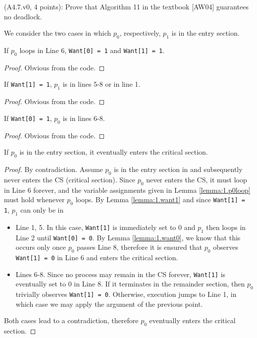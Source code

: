 \begin{Exc}{(A4.7.v0, 4 points):}
Prove that Algorithm 11 in the textbook [AW04] guarantees no deadlock.
\end{Exc}

We consider the two cases in which $p_0$, respectively, $p_1$
is in the entry section.

\begin{lemma} \label{lemma:1.p0loop}
If $p_0$ loops in Line 6, \lstinline|Want[0] = 1| and \lstinline|Want[1] = 1|.
\end{lemma}

\begin{proof}
Obvious from the code.
\end{proof}

\begin{lemma} \label{lemma:1.want1}
If \lstinline|Want[1] = 1|, $p_1$ is in lines 5-8 or in line 1.
\end{lemma}

\begin{proof}
Obvious from the code.
\end{proof}

\begin{lemma} \label{lemma:1.want0}
If \lstinline|Want[0] = 1|, $p_0$ is in lines 6-8.
\end{lemma}

\begin{proof}
Obvious from the code.
\end{proof}

\begin{lemma} \label{lemma:1.p0}
If $p_0$ is in the entry section, it eventually enters the critical section.
\end{lemma}

\begin{proof}
By contradiction. Assume $p_0$ is in the entry section in and subsequently
never enters the CS (critical section).
Since $p_0$ never enters the CS, it must loop in Line 6 forever, and
the variable assignments given in Lemma \ref{lemma:1.p0loop} must hold
whenever $p_0$ loops. By Lemma \ref{lemma:1.want1} and since 
\lstinline|Want[1] = 1|, $p_1$ can only be in

\begin{itemize}
\item Line 1, 5. In this case, \lstinline|Want[1]| is immediately set to 0 and $p_1$
      then loops in Line 2 until \lstinline|Want[0] = 0|. By Lemma \ref{lemma:1.want0},
      we know that this occurs only once $p_0$ passes Line 8, therefore
      it is ensured that $p_0$ observes \lstinline|Want[1] = 0| in Line 6 and
      enters the critical section.
\item Lines 6-8. Since no process may remain in the CS forever, \lstinline|Want[1]|
      is eventually set to 0 in Line 8. If it terminates in the remainder section,
      then $p_0$ trivially observes \lstinline|Want[1] = 0|. Otherwise, execution
      jumps to Line 1, in which case we may apply the argument of the previous point.      
\end{itemize}

Both cases lead to a contradiction, therefore $p_0$ eventually enters the critical
section.
\end{proof}

